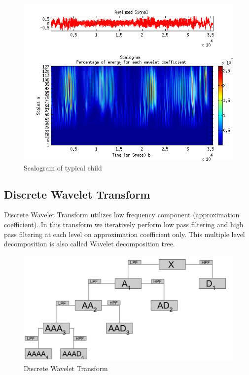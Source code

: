 \documentclass[11pt]{report}
\begin{document}
\begin{enumerate}
\begin{figure}[h]
\centering
\includegraphics[scale=.6]{./images/sca_td.png}
\caption{Scalogram of typical child}
\end{figure}

\newpage
\subsection{Discrete Wavelet Transform}
Discrete Wavelet Transform utilizes low frequency component (approximation coefficient). In this transform we iteratively perform low pass filtering and high pass filtering at each level on approximation coefficient only.
This multiple level decomposition is also called Wavelet decomposition tree.
\end{enumerate}\begin{figure}[h]
\centering
\includegraphics[scale=.45]{./images/dwt.png}
\caption{Discrete Wavelet Transform}
\end{figure}
\end{document}
